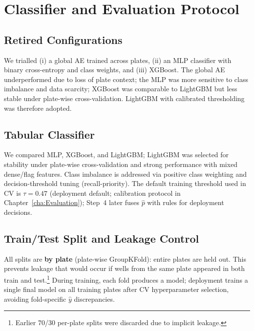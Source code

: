 \section{Classifier and Evaluation Protocol}
\label{sec:clf}

\subsection{Retired Configurations}
\label{sec:retired_configs}
We trialled (i) a global AE trained across plates, (ii) an MLP classifier with binary cross-entropy and class weights, and (iii) XGBoost. The global AE underperformed due to loss of plate context; the MLP was more sensitive to class imbalance and data scarcity; XGBoost was comparable to LightGBM but less stable under plate-wise cross-validation. LightGBM with calibrated thresholding was therefore adopted.

\subsection{Tabular Classifier}
We compared MLP, XGBoost, and LightGBM; LightGBM was selected for stability under plate-wise cross-validation and strong performance with mixed dense/flag features. Class imbalance is addressed via positive class weighting and decision-threshold tuning (recall-priority). The default training threshold used in CV is $\tau=0.47$ (deployment default; calibration protocol in Chapter~\ref{cha:Evaluation}); Step~4 later fuses $\hat p$ with rules for deployment decisions.

\subsection{Train/Test Split and Leakage Control}
All splits are \textbf{by plate} (plate-wise GroupKFold): entire plates are held out. This prevents leakage that would occur if wells from the same plate appeared in both train and test.\footnote{Earlier 70/30 per-plate splits were discarded due to implicit leakage.}
During training, each fold produces a model; deployment trains a single final model on all training plates after CV hyperparameter selection, avoiding fold-specific $\hat{y}$ discrepancies.

